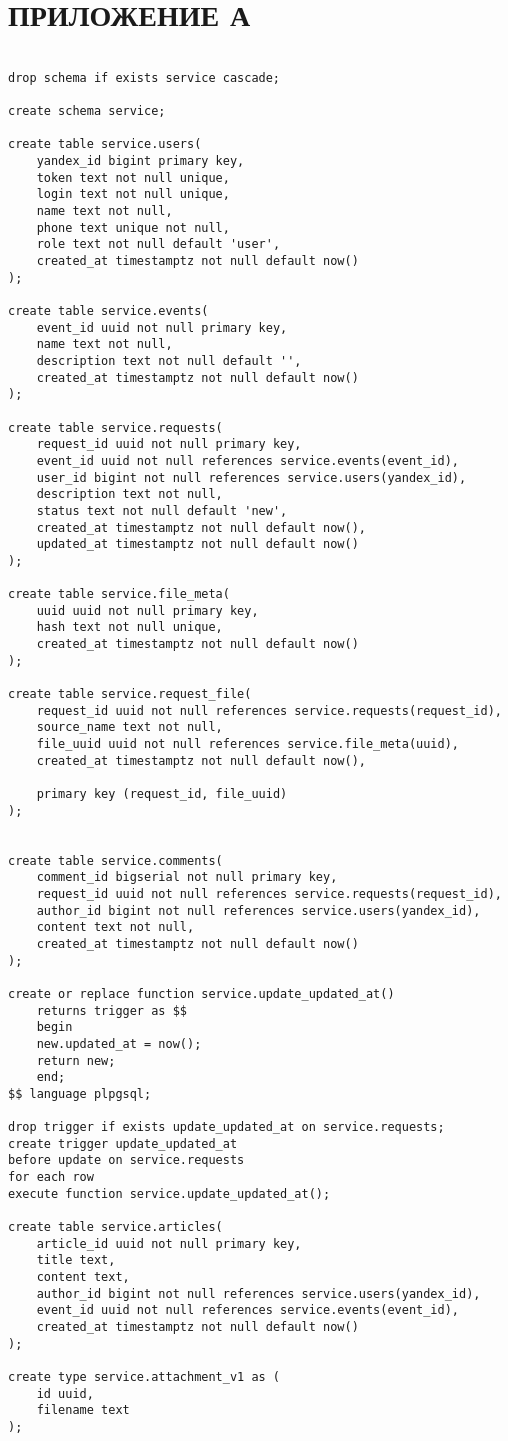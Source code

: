 \section*{ПРИЛОЖЕНИЕ А} \label{ПРИЛОЖЕНИЕ А}

\begin{lstlisting}[label=lst1:schema, caption=Схема базы данных]

drop schema if exists service cascade;

create schema service;

create table service.users(
	yandex_id bigint primary key,
	token text not null unique,
	login text not null unique,
	name text not null,
	phone text unique not null,
	role text not null default 'user',
	created_at timestamptz not null default now()
);

create table service.events(
	event_id uuid not null primary key,
	name text not null,
	description text not null default '',
	created_at timestamptz not null default now()
);

create table service.requests(
	request_id uuid not null primary key,
	event_id uuid not null references service.events(event_id),
	user_id bigint not null references service.users(yandex_id),
	description text not null,
	status text not null default 'new',
	created_at timestamptz not null default now(),
	updated_at timestamptz not null default now()
);

create table service.file_meta(
	uuid uuid not null primary key,
	hash text not null unique,
	created_at timestamptz not null default now()
);

create table service.request_file(
	request_id uuid not null references service.requests(request_id),
	source_name text not null,
	file_uuid uuid not null references service.file_meta(uuid),
	created_at timestamptz not null default now(),
	
	primary key (request_id, file_uuid)
);


create table service.comments(
	comment_id bigserial not null primary key,
	request_id uuid not null references service.requests(request_id),
	author_id bigint not null references service.users(yandex_id),
	content text not null,
	created_at timestamptz not null default now()
);

create or replace function service.update_updated_at()
	returns trigger as $$
	begin
	new.updated_at = now();
	return new;
	end;
$$ language plpgsql;

drop trigger if exists update_updated_at on service.requests;
create trigger update_updated_at
before update on service.requests
for each row
execute function service.update_updated_at();

create table service.articles(
	article_id uuid not null primary key,
	title text,
	content text,
	author_id bigint not null references service.users(yandex_id),
	event_id uuid not null references service.events(event_id),
	created_at timestamptz not null default now()
);

create type service.attachment_v1 as (
	id uuid,
	filename text
);


\end{lstlisting}
